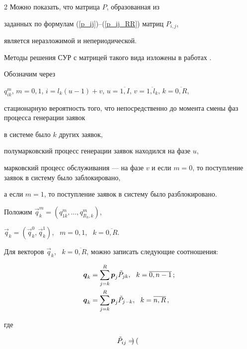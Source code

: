 \begin{multicols}{2}
Можно показать, что матрица $P$, образованная из


заданных по формулам (\ref{p_ij})--(\ref{p_ij_RR}) матриц $P_{i,j}$,


является неразложимой и непериодической.


Методы решения СУР с матрицей такого вида изложены в работах \cite{BDPS03,BDPS04}.








Обозначим через


$q^m_{ik}$, $m=0,1$, $i=l_k(u-1)+v$, $u=\overline{1,I}$, $v=\overline{1,l_k}$, $k=\overline{0,R}$,


стационарную вероятность того, что непосредственно до момента смены фаз процесса генерации заявок


в системе было $k$ других заявок,


полумарковский процесс генерации заявок находился на фазе $u$,


марковский процесс обслуживания --- на фазе $v$ и если $m=0$, то поступление заявок в систему было заблокировано,


а если $m=1$, то поступление заявок в систему было разблокировано.


Положим $\vec{q}^{m}_k=(q^{m}_{1k},\ldots,q^{m}_{Il_k,k})$,


$\vec{q}_k = (\vec{q}^0_k,\vec{q}^1_k)$, \ $m=0,1$, \ $k=\overline{0,R}$.





Для векторов $\vec{q}_k$, \ $k=\overline{0,R}$, можно записать следующие соотношения:


\begin{align}


\label{q_1}


\vec{q}_k &=\sum\limits_{j=k}^{R} \vec{p}_j \Tilde P_{jk},\ \ k=\overline{0,n-1}\,;


\\


\label{q_2}


\vec{q}_k &= \sum\limits_{j=k}^{R} \vec{p}_j \Tilde P_{j-k},\ \ k=\overline{n,R}\,,


\end{align}


где


\begin{align*}


\Tilde P_{ij} &=


\begin{pmatrix}



\end{pmatrix}
\end{align*}
\end{multicols}

